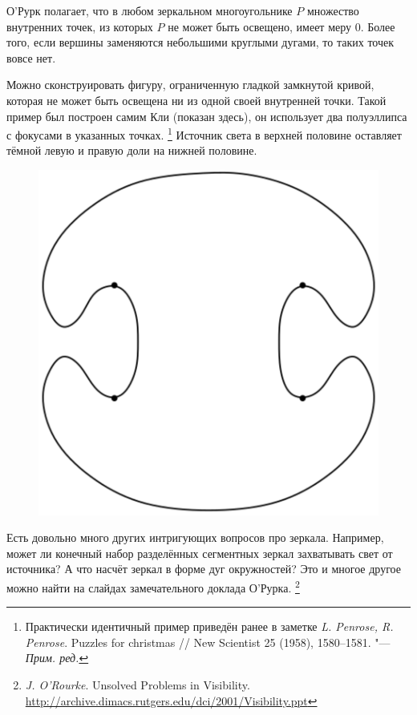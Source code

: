 \documentclass[twoside]{book}
\begin{document}
О’Рурк полагает, что в любом зеркальном многоугольнике $P$ множество внутренних точек, из которых $P$ не может быть освещено, имеет меру 0.
Более того, если вершины заменяются небольшими круглыми дугами, то таких точек вовсе нет.


Можно сконструировать фигуру, ограниченную гладкой замкнутой кривой, которая не может быть освещена ни из одной своей внутренней точки. 
Такой пример был построен самим Кли (показан здесь), он использует два полуэллипса с фокусами в указанных точках.%
\footnote{Практически идентичный пример приведён ранее в заметке \emph{L. Penrose, R. Penrose}. Puzzles for christmas /\!/ {New Scientist} 25 (1958), 1580--1581. "--- \emph{Прим. ред.}}
Источник света в верхней половине оставляет тёмной левую и правую доли на нижней половине.


\begin{figure}[!ht]
\centering
\includegraphics[scale=0.5]{Figs/UnsolvedPuzzles/klee}
\end{figure} 

Есть довольно много других интригующих вопросов про зеркала.
Например, может ли конечный набор разделённых сегментных зеркал захватывать свет от источника?
А что насчёт зеркал в форме дуг окружностей?
Это и многое другое можно найти на слайдах замечательного доклада О’Рурка.%
\footnote{\emph{J. O'Rourke}. Unsolved Problems in Visibility. \url{http://archive.dimacs.rutgers.edu/dci/2001/Visibility.ppt}}
\end{document}
